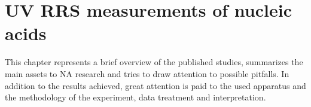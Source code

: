 \chapter{UV RRS measurements of nucleic acids}

This chapter represents a brief overview of the published studies, summarizes
the main assets to NA research and tries to draw attention to possible
pitfalls.
In addition to the results achieved, great attention is paid to the used
apparatus and the methodology of the experiment, data treatment and
interpretation.





